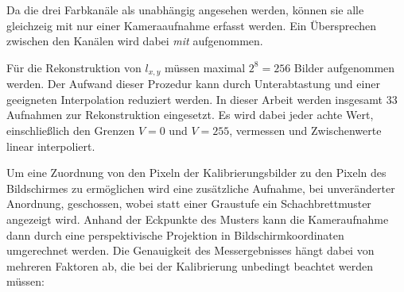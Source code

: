    Da die drei Farbkanäle als unabhängig angesehen werden, können sie alle gleichzeig mit nur einer Kameraaufnahme erfasst werden. 
 Ein Übersprechen zwischen den Kanälen wird dabei \emph{mit} aufgenommen.

   Für die Rekonstruktion von $l_{x,y}$ müssen maximal  $2^8 = 256$ Bilder aufgenommen werden.
   Der Aufwand dieser Prozedur kann durch Unterabtastung und einer geeigneten Interpolation reduziert werden.
   In dieser Arbeit werden insgesamt 33 Aufnahmen zur Rekonstruktion eingesetzt.
   Es wird dabei jeder achte Wert, einschließlich den Grenzen $V=0$ und $V=255$, vermessen und Zwischenwerte linear interpoliert.

   Um eine Zuordnung von den Pixeln der Kalibrierungsbilder zu den Pixeln des Bildschirmes zu ermöglichen wird eine zusätzliche Aufnahme, bei unveränderter Anordnung, geschossen, wobei statt einer Graustufe ein
    Schachbrettmuster angezeigt wird.
   Anhand der Eckpunkte des Musters kann die Kameraufnahme dann durch eine perspektivische Projektion in Bildschirmkoordinaten umgerechnet werden.
   Die Genauigkeit des Messergebnisses hängt dabei von mehreren Faktoren ab, die bei der Kalibrierung unbedingt beachtet werden müssen:
  
